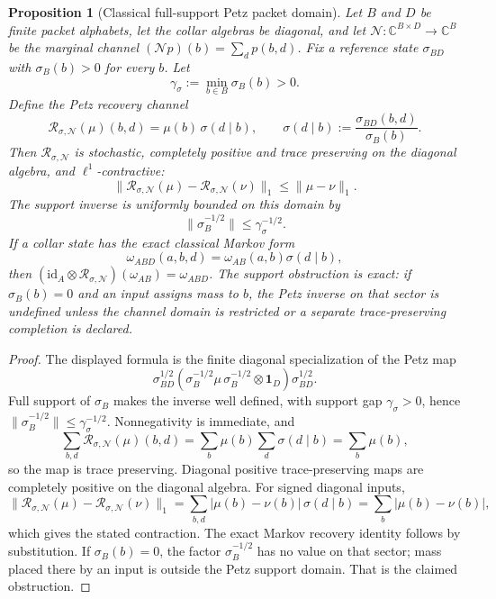 \documentclass[11pt]{article}
\newtheorem{proposition}[theorem]{Proposition}
\theoremstyle{remark}
\theoremstyle{plain}
\begin{document}
\begin{proposition}[Classical full-support Petz packet domain]\label{prop:classical-petz-packet}
Let \(B\) and \(D\) be finite packet alphabets, let the collar algebras be diagonal, and let
\(\mathcal N:\mathbb C^{B\times D}\to\mathbb C^B\) be the marginal channel
\((\mathcal N p)(b)=\sum_d p(b,d)\). Fix a reference state \(\sigma_{BD}\) with
\(\sigma_B(b)>0\) for every \(b\). Let
\[
\gamma_\sigma:=\min_{b\in B}\sigma_B(b)>0.
\]
Define the Petz recovery channel
\[
\mathcal R_{\sigma,\mathcal N}(\mu)(b,d)
=
\mu(b)\,\sigma(d\mid b),
\qquad
\sigma(d\mid b):=\frac{\sigma_{BD}(b,d)}{\sigma_B(b)}.
\]
Then \(\mathcal R_{\sigma,\mathcal N}\) is stochastic, completely positive and trace preserving
on the diagonal algebra, and \(\ell^1\)-contractive:
\[
\|\mathcal R_{\sigma,\mathcal N}(\mu)-\mathcal R_{\sigma,\mathcal N}(\nu)\|_1
\le
\|\mu-\nu\|_1.
\]
The support inverse is uniformly bounded on this domain by
\[
\|\sigma_B^{-1/2}\|\le \gamma_\sigma^{-1/2}.
\]
If a collar state has the exact classical Markov form
\[
\omega_{ABD}(a,b,d)=\omega_{AB}(a,b)\sigma(d\mid b),
\]
then \((\mathrm{id}_A\otimes\mathcal R_{\sigma,\mathcal N})(\omega_{AB})=\omega_{ABD}\).
The support obstruction is exact: if \(\sigma_B(b)=0\) and an input assigns mass to \(b\), the
Petz inverse on that sector is undefined unless the channel domain is restricted or a separate
trace-preserving completion is declared.
\end{proposition}

\begin{proof}
The displayed formula is the finite diagonal specialization of the Petz map
\[
\sigma_{BD}^{1/2}
\left(\sigma_B^{-1/2}\mu\,\sigma_B^{-1/2}\otimes \mathbf 1_D\right)
\sigma_{BD}^{1/2}.
\]
Full support of \(\sigma_B\) makes the inverse well defined, with support gap
\(\gamma_\sigma>0\), hence \(\|\sigma_B^{-1/2}\|\le\gamma_\sigma^{-1/2}\). Nonnegativity is immediate, and
\[
\sum_{b,d}\mathcal R_{\sigma,\mathcal N}(\mu)(b,d)
=
\sum_b \mu(b)\sum_d\sigma(d\mid b)
=
\sum_b\mu(b),
\]
so the map is trace preserving. Diagonal positive trace-preserving maps are completely positive on
the diagonal algebra. For signed diagonal inputs,
\[
\|\mathcal R_{\sigma,\mathcal N}(\mu)-\mathcal R_{\sigma,\mathcal N}(\nu)\|_1
=
\sum_{b,d}|\mu(b)-\nu(b)|\,\sigma(d\mid b)
=
\sum_b|\mu(b)-\nu(b)|,
\]
which gives the stated contraction. The exact Markov recovery identity follows by substitution.
If \(\sigma_B(b)=0\), the factor \(\sigma_B^{-1/2}\) has no value on that sector; mass placed
there by an input is outside the Petz support domain. That is the claimed obstruction.
\end{proof}
\end{document}
